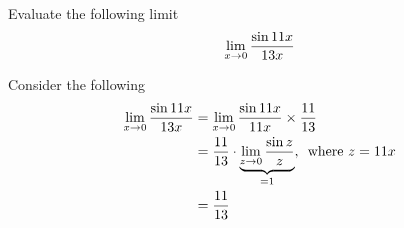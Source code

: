 



\question[4] Evaluate the following limit \[ \lim_{x\to 0}\dfrac{\sin11 x}{13 x}\]

\watchout[-40pt]

\begin{solution}[\mcq]
  Consider the following
  \begin{align}
    \lim_{x\to 0}\dfrac{\sin11 x}{13 x} &= \lim_{x\to 0}\dfrac{\sin11 x}{11 x}\times\dfrac{11}{13} \\
    &= \dfrac{11}{13}\cdot
    \underbrace{\lim_{z\to 0}\dfrac{\sin z}{z}}_{=1},\,\text{ where } z = 11 x \\
    &= \dfrac{11}{13}
  \end{align}
\end{solution}

